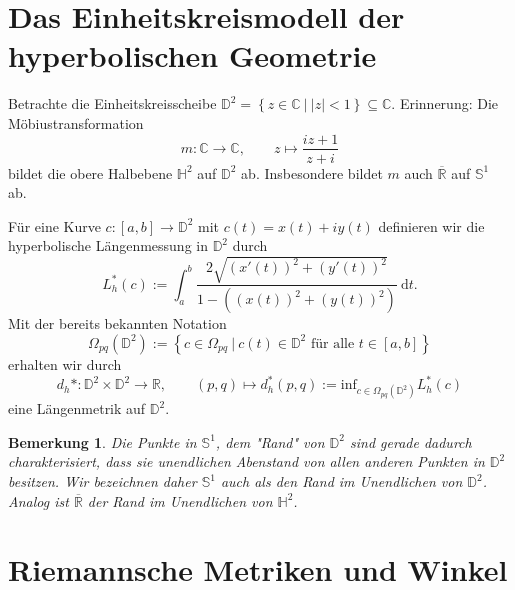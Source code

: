 \documentclass[11pt]{book}
\numberwithin{dummy}{section}
\newtheorem{remark}[theorem]{Bemerkung}
\theoremstyle{nonumberbreak}
\newenvironment{defin}[1][]{\ifthenelse{\equal{#1}{}}{\definition}{\definition[#1]}\rm}{\enddefinition}
\newcommand{\C}{\mathbb{C}}
\newcommand{\R}{\mathbb{R}}
\newcommand{\He}{\mathbb{H}}
\newcommand{\RR}{\overline{\mathbb{R}}}
\newcommand{\D}{\mathbb{D}}
\newcommand{\la}{\longrightarrow}
\begin{document}
\begin{spacing}{1.4}
\section{Das Einheitskreismodell der hyperbolischen Geometrie} %




Betrachte die Einheitskreisscheibe $\mathbb{D}^2 = \left\{ z \in \C \ \vert \ \vert z \vert <1\right\} \subseteq \C$. Erinnerung: Die Möbiustransformation
$$m: \C \la \C, \qquad z \mapsto \frac{iz+1}{z+i}$$
bildet die obere Halbebene $\He^2$ auf $\D^2$ ab. Insbesondere bildet $m$ auch $\RR$ auf $\mathbb{S}^1$ ab.


\begin{defin}
Für eine Kurve $c: [a,b] \la \D^2$ mit $c(t) = x(t) + i y(t)$ definieren wir die hyperbolische Längenmessung in $\D^2$ durch 
$$L_h^{*}(c) := \int_a^b \frac{2 \sqrt{(x'(t))^2+ (y'(t))^2}}{1- ((x(t))^2 + (y(t))^2)} \ \mathrm{d}t.$$
Mit der bereits bekannten Notation 
$$\Omega_{pq}(\D^2) := \left\{ c \in \Omega_{pq} \ \vert \ c(t) \in \D^2 \textrm{ für alle } t \in [a,b] \right\}$$
erhalten wir durch 
$$d_h*: \D^2 \times \D^2 \la \R, \qquad (p,q) \mapsto d_h^{*}(p,q) := \mathrm{inf}_{c \in \Omega_{pq}(\D^2)} L_h^{*}(c)$$
eine Längenmetrik auf $\D^2$.


\end{defin}


\begin{remark}
Die Punkte in $\mathbb{S}^1$, dem "Rand" von $\D^2$ sind gerade dadurch charakterisiert, dass sie unendlichen Abenstand von allen anderen Punkten in $\D^2$ besitzen. Wir bezeichnen daher $\mathbb{S}^1$ auch als den \textit{Rand im Unendlichen} von $\D^2$. Analog ist $\RR$ der Rand im Unendlichen von $\He^2$.
\end{remark}









\section{Riemannsche Metriken und Winkel} %






\end{spacing}
\end{document}
